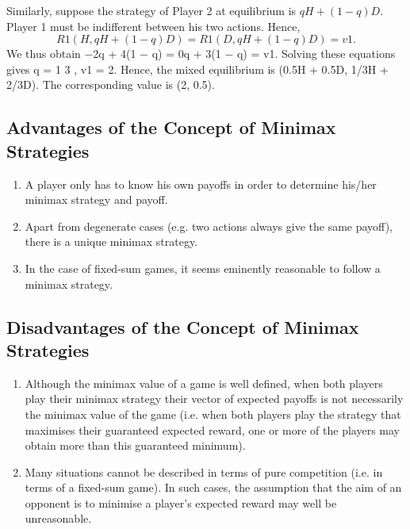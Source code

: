 \documentclass[]{article}
\begin{document}
	Similarly, suppose the strategy of Player 2 at equilibrium is
	$qH + (1 − q)D$. Player 1 must be indifferent between his two
	actions. Hence,
	\[R1(H, qH + (1 − q)D) = R1(D, qH + (1 − q)D) = v1.\]
	We thus obtain −2q + 4(1 − q) = 0q + 3(1 − q) = v1. Solving
	these equations gives q =
	1
	3
	, v1 = 2.
	Hence, the mixed equilibrium is (0.5H + 0.5D, 1/3H + 2/3D). The
	corresponding value is (2, 0.5).
	\subsection{Advantages of the Concept of Minimax Strategies}
	\begin{enumerate}
		\item  A player only has to know his own payoffs in order to
		determine his/her minimax strategy and payoff.
		\item  Apart from degenerate cases (e.g. two actions always
		give the same payoff), there is a unique minimax
		strategy.
		\item  In the case of fixed-sum games, it seems eminently
		reasonable to follow a minimax strategy.
	\end{enumerate}
	
	\subsection{Disadvantages of the Concept of Minimax Strategies}
	\begin{enumerate}
		\item  Although the minimax value of a game is well
		defined, when both players play their minimax
		strategy their vector of expected payoffs is not
		necessarily the minimax value of the game (i.e. when
		both players play the strategy that maximises their
		guaranteed expected reward, one or more of the
		players may obtain more than this guaranteed
		minimum).
		\item Many situations cannot be described in terms of pure
		competition (i.e. in terms of a fixed-sum game). In
		such cases, the assumption that the aim of an
		opponent is to minimise a player’s expected reward
		may well be unreasonable.
	\end{enumerate}
	
\end{document}
